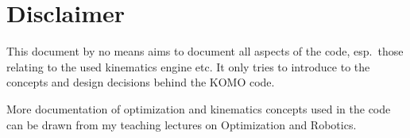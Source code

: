 \documentclass[10pt,fleqn,twoside]{article}
\begin{document}
\section{Disclaimer}

This document by no means aims to document all aspects of the code,
esp.\ those relating to the used kinematics engine etc. It only tries
to introduce to the concepts and design decisions behind the KOMO
code.

More documentation of optimization and kinematics concepts used in the
code can be drawn from my teaching lectures on Optimization and
Robotics.


%
%
\end{document}
